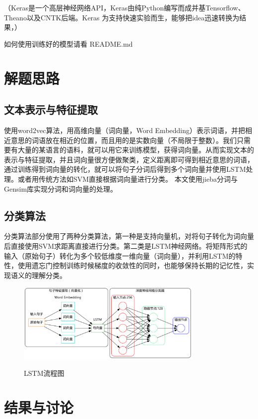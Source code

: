 \documentclass[UTF8]{ctexart}
\begin{document}
（Keras是一个高层神经网络API，Keras由纯Python编写而成并基Tensorflow、Theano以及CNTK后端。Keras 为支持快速实验而生，能够把idea迅速转换为结果，）

如何使用训练好的模型请看 README.md
\vspace{3mm}

\clearpage

\section{解题思路}
\subsection{文本表示与特征提取}
使用word2vec算法，用高维向量（词向量，Word Embedding）表示词语，并把相近意思的词语放在相近的位置，而且用的是实数向量（不局限于整数）。我们只需要有大量的某语言的语料，就可以用它来训练模型，获得词向量。从而实现文本的表示与特征提取，并且词向量很方便做聚类，定义距离即可得到相近意思的词语，
通过训练得到词向量的转化，就可以将句子分词后得到多个词向量并使用LSTM处理。或者用传统方法如SVM直接根据词向量进行分类。
本文使用jieba分词与Gensim库实现分词和词向量的处理。
\subsection{分类算法}
分类算法部分使用了两种分类算法，第一种是支持向量机，对将句子转化为词向量后直接使用SVM求距离直接进行分类。第二类是LSTM神经网络。将矩阵形式的输入（原始句子）转化为多个较低维度一维向量（词向量），并利用LSTM的特性，使用遗忘门控制训练时候梯度的收敛性的同时，也能够保持长期的记忆性，实现语义的理解分类。
\begin{figure}[H]
  \centering
  \label{fig:Per6A}\includegraphics[width=0.8\textwidth]{lstm.png}\
  \caption{LSTM流程图}
  \label{fig:oscil}
\end{figure}

\clearpage %

\section{结果与讨论}
\end{document}
